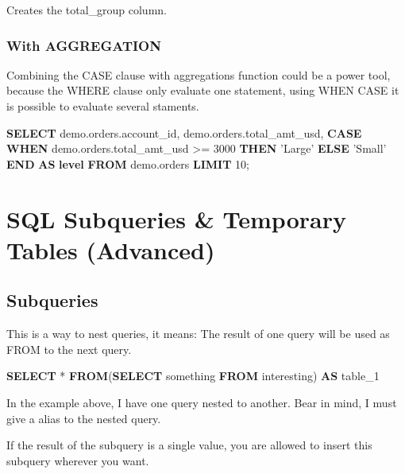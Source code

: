 \documentclass[]{book}
\newenvironment{Shaded}{\begin{snugshade}}{\end{snugshade}}
\newcommand{\KeywordTok}[1]{\textcolor[rgb]{0.13,0.29,0.53}{\textbf{#1}}}
\newcommand{\DecValTok}[1]{\textcolor[rgb]{0.00,0.00,0.81}{#1}}
\newcommand{\StringTok}[1]{\textcolor[rgb]{0.31,0.60,0.02}{#1}}
\newcommand{\NormalTok}[1]{#1}
\begin{document}
Creates the total\_group column.

\subsubsection{With AGGREGATION}\label{with-aggregation}

Combining the CASE clause with aggregations function could be a power
tool, because the WHERE clause only evaluate one statement, using WHEN
CASE it is possible to evaluate several staments.

\begin{Shaded}
\begin{Highlighting}[]
\KeywordTok{SELECT}\NormalTok{ demo.orders.account_id,}
\NormalTok{       demo.orders.total_amt_usd,}
       \KeywordTok{CASE} \KeywordTok{WHEN}\NormalTok{ demo.orders.total_amt_usd >= }\DecValTok{3000} \KeywordTok{THEN} \StringTok{'Large'}
            \KeywordTok{ELSE} \StringTok{'Small'} \KeywordTok{END} \KeywordTok{AS} \KeywordTok{level}
\KeywordTok{FROM}\NormalTok{ demo.orders}
\KeywordTok{LIMIT} \DecValTok{10}\NormalTok{;}
\end{Highlighting}
\end{Shaded}

\section{SQL Subqueries \& Temporary Tables
(Advanced)}\label{sql-subqueries-temporary-tables-advanced}

\subsection{Subqueries}\label{subqueries}

This is a way to nest queries, it means: The result of one query will be
used as FROM to the next query.

\begin{Shaded}
\begin{Highlighting}[]
\KeywordTok{SELECT}\NormalTok{ *}
\KeywordTok{FROM}\NormalTok{(}\KeywordTok{SELECT}\NormalTok{ something}
     \KeywordTok{FROM}\NormalTok{   interesting) }\KeywordTok{AS}\NormalTok{ table_}\DecValTok{1}
\end{Highlighting}
\end{Shaded}

In the example above, I have one query nested to another. Bear in mind,
I must give a alias to the nested query.

If the result of the subquery is a single value, you are allowed to
insert this subquery wherever you want.
\end{document}
